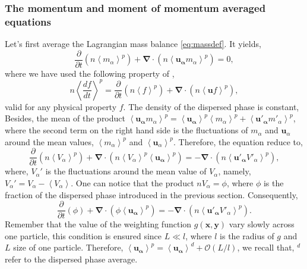 \subsubsection*{The momentum and moment of momentum averaged equations}
Let's first average the Lagrangian mass balance \ref{eq:massdef}.
It yields,   
\begin{equation}
    \frac{\partial }{\partial t}(n\left<m_\alpha\right>^p) 
    + \bm{\nabla}\cdot(n\left<\bm{u_\alpha}m_\alpha\right>^p)
    = 0,
\end{equation}  
where we have used the following property of \citep{anderson1967fluid},
\begin{equation*}
    n \left<\frac{d f}{dt}\right>^p 
    = \frac{\partial }{\partial t}(n\left<f\right>^p) 
    + \bm{\nabla}\cdot(n\left<\bm{u} f\right>^p),
\end{equation*}
valid for any physical property $f$.
The density of the dispersed phase is constant,
Besides, the mean of the product $\left<\bm{u_\alpha}m_\alpha\right>^p = \left<\bm{u_\alpha}\right>^p\left<m_\alpha\right>^p+\left<\bm{u'_\alpha}m'_\alpha\right>^p$, where the second term on the right hand side is the fluctuations of $m_\alpha$ and $\bm{u}_\alpha$ around the mean values, $\left<m_\alpha\right>^p$ and $\left<\bm{u}_\alpha\right>^p$. 
Therefore, the equation reduce to,
\begin{equation}
    \frac{\partial }{\partial t}(n\left<V_\alpha\right>^p) 
    + \bm{\nabla}\cdot(n\left<V_\alpha\right>^p\left<\bm{u_\alpha}\right>^p )
    = 
    - \bm{\nabla}\cdot(n\left<\bm{u'_\alpha}V'_\alpha\right>^p),
\end{equation}  
where, $V_\alpha'$ is the fluctuations around the mean value of $V_\alpha$,
namely, $V_\alpha' = V_\alpha - \left<V_\alpha\right>$.
One can notice that the product $nV_\alpha = \phi$, where $\phi$ is the fraction of the dispersed phase introduced in the previous section. 
Consequently, 
\begin{equation}
    \frac{\partial }{\partial t}(\phi) 
    + \bm{\nabla}\cdot(\phi\left<\bm{u_\alpha}\right>^p )
    = 
    - \bm{\nabla}\cdot(n\left<\bm{u'_\alpha}V'_\alpha\right>^p).
    \label{eq:massavg}
\end{equation}  
Remember that the value of the weighting function $g(\bm{x},\bm{y})$ vary slowly across one particle, this condition is ensured since $L\ll l$, where $l$ is the radius of $g$ and $L$ size of one particle. 
Therefore, $\left<\bm{u_\alpha}\right>^p =\left<\bm{u_\alpha}\right>^d + \mathcal{O}\left(L/l\right)$, we recall that, $^d$ refer to the dispersed phase average.
